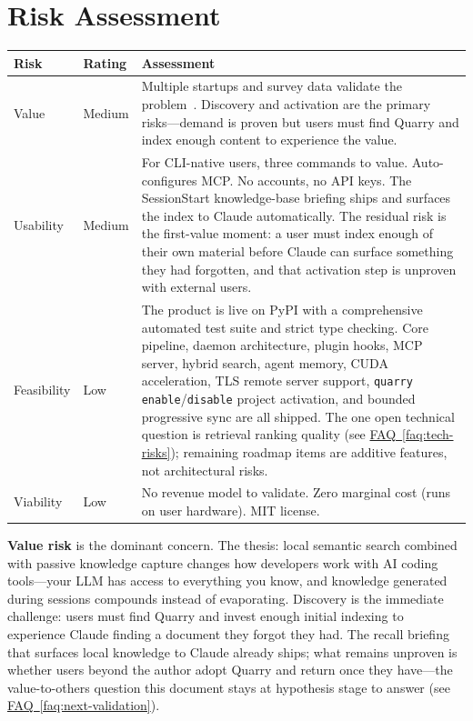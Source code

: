 \documentclass[11pt,letterpaper]{article}
\newcommand{\faqref}[1]{\hyperref[#1]{FAQ~\ref*{#1}}}
\begin{document}

\newpage
\section*{Risk Assessment}

\renewcommand{\arraystretch}{1.6}
\begin{tabularx}{\textwidth}{@{} l l X @{}}
\toprule
\textbf{\color{SectionBlue}Risk} & \textbf{\color{SectionBlue}Rating} & \textbf{\color{SectionBlue}Assessment} \\
\midrule
Value      & \textcolor{RiskAmber}{Medium} & Multiple startups and survey data validate the problem~\cite{qodo2025aicodequality,techcrunch2026entirefunding}. Discovery and activation are the primary risks---demand is proven but users must find Quarry and index enough content to experience the value. \\
Usability  & \textcolor{RiskAmber}{Medium} & For CLI-native users, three commands to value. Auto-configures MCP. No accounts, no API keys. The SessionStart knowledge-base briefing ships and surfaces the index to Claude automatically. The residual risk is the first-value moment: a user must index enough of their own material before Claude can surface something they had forgotten, and that activation step is unproven with external users. \\
Feasibility & \textcolor{RiskGreen}{Low} & The product is live on PyPI with a comprehensive automated test suite and strict type checking. Core pipeline, daemon architecture, plugin hooks, MCP server, hybrid search, agent memory, CUDA acceleration, TLS remote server support, \texttt{quarry enable}/\texttt{disable} project activation, and bounded progressive sync are all shipped. The one open technical question is retrieval ranking quality (see \faqref{faq:tech-risks}); remaining roadmap items are additive features, not architectural risks. \\
Viability  & \textcolor{RiskGreen}{Low} & No revenue model to validate. Zero marginal cost (runs on user hardware). MIT license. \\
\bottomrule
\end{tabularx}
\renewcommand{\arraystretch}{1.0}

\vspace{1em}

\textbf{Value risk} is the dominant concern. The thesis: local semantic search
combined with passive knowledge capture changes how developers work with AI
coding tools---your LLM has access to everything you know, and knowledge
generated during sessions compounds instead of evaporating. Discovery is the
immediate challenge: users must find Quarry and invest enough initial indexing
to experience Claude finding a document they forgot they had. The recall
briefing that surfaces local knowledge to Claude already ships; what remains
unproven is whether users beyond the author adopt Quarry and return once they
have---the value-to-others question this document stays at hypothesis stage to
answer (see \faqref{faq:next-validation}).
\end{document}
